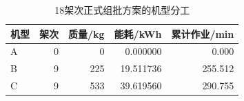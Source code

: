 \begin{table}[htbp]\centering\small
\caption{18架次正式组批方案的机型分工}\label{tab:rev_q1_types}
\begin{tabular}{lrrrr}\toprule
机型 & 架次 & 质量/kg & 能耗/kWh & 累计作业/min\\\midrule
A & 0 & 0 & 0.000000 & 0.000\\
B & 9 & 225 & 19.511736 & 255.512\\
C & 9 & 533 & 39.619560 & 290.755\\
\bottomrule\end{tabular}
\end{table}
